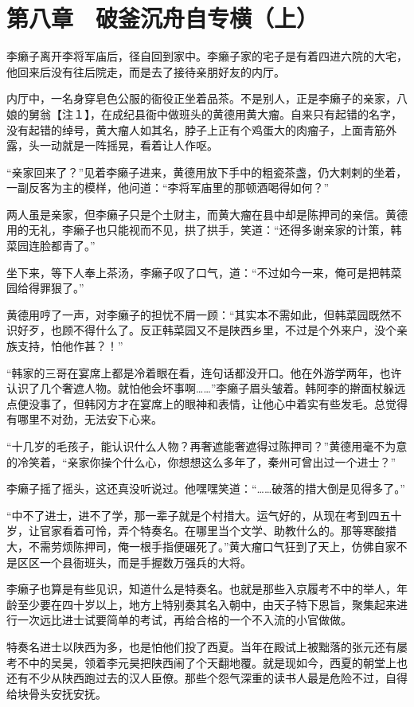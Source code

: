\section{第八章　破釜沉舟自专横（上）}

李癞子离开李将军庙后，径自回到家中。李癞子家的宅子是有着四进六院的大宅，他回来后没有往后院走，而是去了接待亲朋好友的内厅。

内厅中，一名身穿皂色公服的衙役正坐着品茶。不是别人，正是李癞子的亲家，八娘的舅翁【注１】，在成纪县衙中做班头的黄德用黄大瘤。自来只有起错的名字，没有起错的绰号，黄大瘤人如其名，脖子上正有个鸡蛋大的肉瘤子，上面青筋外露，头一动就是一阵摇晃，看着让人作呕。

“亲家回来了？”见着李癞子进来，黄德用放下手中的粗瓷茶盏，仍大剌剌的坐着，一副反客为主的模样，他问道：“李将军庙里的那顿酒喝得如何？”

两人虽是亲家，但李癞子只是个土财主，而黄大瘤在县中却是陈押司的亲信。黄德用的无礼，李癞子也只能视而不见，拱了拱手，笑道：“还得多谢亲家的计策，韩菜园连脸都青了。”

坐下来，等下人奉上茶汤，李癞子叹了口气，道：“不过如今一来，俺可是把韩菜园给得罪狠了。”

黄德用哼了一声，对李癞子的担忧不屑一顾：“其实本不需如此，但韩菜园既然不识好歹，也顾不得什么了。反正韩菜园又不是陕西乡里，不过是个外来户，没个亲族支持，怕他作甚？！”

“韩家的三哥在宴席上都是冷着眼在看，连句话都没开口。他在外游学两年，也许认识了几个奢遮人物。就怕他会坏事啊……”李癞子眉头皱着。韩阿李的擀面杖躲远点便没事了，但韩冈方才在宴席上的眼神和表情，让他心中着实有些发毛。总觉得有哪里不对劲，无法安下心来。

“十几岁的毛孩子，能认识什么人物？再奢遮能奢遮得过陈押司？”黄德用毫不为意的冷笑着，“亲家你操个什么心，你想想这么多年了，秦州可曾出过一个进士？”

李癞子摇了摇头，这还真没听说过。他嘿嘿笑道：“……破落的措大倒是见得多了。”

“中不了进士，进不了学，那一辈子就是个村措大。运气好的，从现在考到四五十岁，让官家看着可怜，弄个特奏名。在哪里当个文学、助教什么的。那等寒酸措大，不需劳烦陈押司，俺一根手指便碾死了。”黄大瘤口气狂到了天上，仿佛自家不是区区一个县衙班头，而是手握数万强兵的大将。

李癞子也算是有些见识，知道什么是特奏名。也就是那些入京履考不中的举人，年龄至少要在四十岁以上，地方上特别奏其名入朝中，由天子特下恩旨，聚集起来进行一次远比进士试要简单的考试，再给合格的一个不入流的小官做做。

特奏名进士以陕西为多，也是怕他们投了西夏。当年在殿试上被黜落的张元还有屡考不中的吴昊，领着李元昊把陕西闹了个天翻地覆。就是现如今，西夏的朝堂上也还有不少从陕西跑过去的汉人臣僚。那些个怨气深重的读书人最是危险不过，自得给块骨头安抚安抚。

